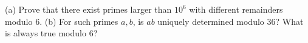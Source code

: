 (a) Prove that there exist primes larger than $10^6$ with different remainders modulo $6$. (b) For such primes $a,b$, is $ab$ uniquely determined modulo $36$? What is always true modulo $6$?
